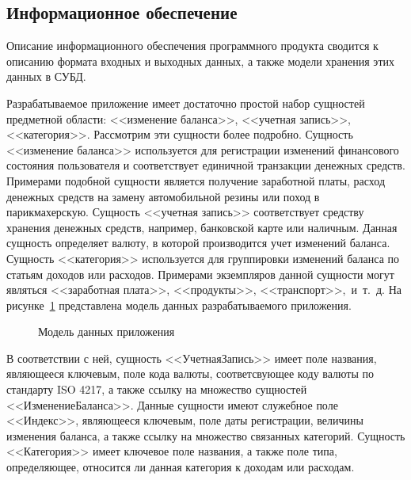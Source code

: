 \subsection{Информационное обеспечение}

Описание информационного обеспечения программного продукта сводится
к описанию формата входных и выходных данных, а также модели хранения
этих данных в СУБД.

Разрабатываемое приложение имеет достаточно простой набор сущностей
предметной области: <<изменение баланса>>, <<учетная запись>>, <<категория>>.
Рассмотрим эти сущности более подробно.
Сущность <<изменение баланса>> используется для регистрации изменений
финансового состояния пользователя и соответствует единичной транзакции
денежных средств.
Примерами подобной сущности является получение заработной платы,
расход денежных средств на замену автомобильной резины или поход в
парикмахерскую.
Сущность <<учетная запись>> соответствует средству хранения денежных
средств, например, банковской карте или наличным.
Данная сущность определяет валюту, в которой производится учет изменений
баланса.
Сущность <<категория>> используется для группировки изменений баланса
по статьям доходов или расходов. Примерами экземпляров данной сущности
могут являться <<заработная плата>>, <<продукты>>, <<транспорт>>,~и~т.~д.
На рисунке~\ref{fig:design_entities} представлена модель данных
разрабатываемого приложения.

\begin{figure}[h!]
  \centering
  \caption{Модель данных приложения}
  \label{fig:design_entities}
\end{figure}

В соответствии с ней, сущность <<УчетнаяЗапись>> имеет поле названия,
являющееся ключевым, поле кода валюты, соответсвующее коду валюты по
стандарту ISO 4217, а также ссылку на множество сущностей
<<ИзменениеБаланса>>. Данные сущности имеют служебное поле <<Индекс>>,
являющееся ключевым, поле даты регистрации, величины изменения баланса,
а также ссылку на множество связанных категорий.
Сущность <<Категория>> имеет ключевое поле названия, а также поле типа,
определяющее, относится ли данная категория к доходам или расходам.

